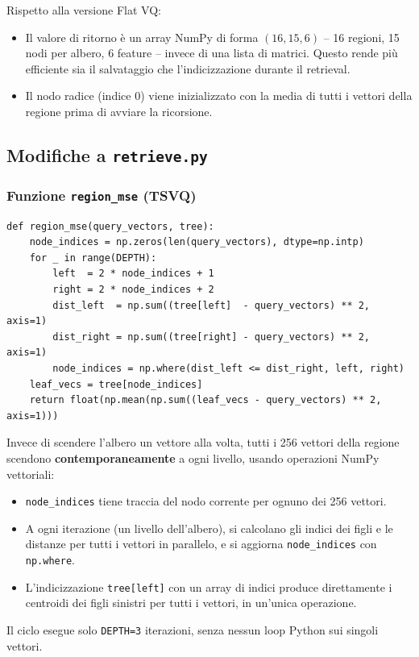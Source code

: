\documentclass[12pt, a4paper]{article}
\begin{document}
Rispetto alla versione Flat VQ:
\begin{itemize}
    \item Il valore di ritorno è un array NumPy di forma $(16, 15, 6)$ -- 16 regioni, 15
          nodi per albero, 6 feature -- invece di una lista di matrici. Questo rende più
          efficiente sia il salvataggio che l'indicizzazione durante il retrieval.
    \item Il nodo radice (indice 0) viene inizializzato con la media di tutti i vettori
          della regione prima di avviare la ricorsione.
\end{itemize}

\subsection{Modifiche a \texttt{retrieve.py}}

\subsubsection{Funzione \texttt{region\_mse} (TSVQ)}

\begin{lstlisting}[caption={Funzione \texttt{region\_mse} TSVQ con traversata vettorizzata}]
def region_mse(query_vectors, tree):
    node_indices = np.zeros(len(query_vectors), dtype=np.intp)
    for _ in range(DEPTH):
        left  = 2 * node_indices + 1
        right = 2 * node_indices + 2
        dist_left  = np.sum((tree[left]  - query_vectors) ** 2, axis=1)
        dist_right = np.sum((tree[right] - query_vectors) ** 2, axis=1)
        node_indices = np.where(dist_left <= dist_right, left, right)
    leaf_vecs = tree[node_indices]
    return float(np.mean(np.sum((leaf_vecs - query_vectors) ** 2, axis=1)))
\end{lstlisting}

Invece di scendere l'albero un vettore alla volta, tutti i 256 vettori della regione
scendono \textbf{contemporaneamente} a ogni livello, usando operazioni NumPy vettoriali:
\begin{itemize}
    \item \texttt{node\_indices} tiene traccia del nodo corrente per ognuno dei 256 vettori.
    \item A ogni iterazione (un livello dell'albero), si calcolano gli indici dei figli e
          le distanze per tutti i vettori in parallelo, e si aggiorna \texttt{node\_indices}
          con \texttt{np.where}.
    \item L'indicizzazione \texttt{tree[left]} con un array di indici produce direttamente
          i centroidi dei figli sinistri per tutti i vettori, in un'unica operazione.
\end{itemize}
Il ciclo esegue solo \texttt{DEPTH=3} iterazioni, senza nessun loop Python sui singoli
vettori.
\end{document}

